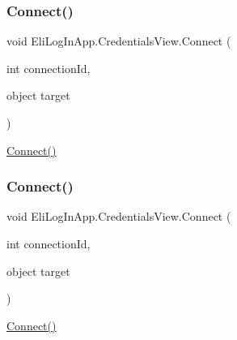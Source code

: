 \mbox{\label{class_eli_log_in_app_1_1_credentials_view_a0a2179d420f12bec24a13d3f35da3b8a}} 
\subsubsection{\texorpdfstring{Connect()}{Connect()}\hspace{0.1cm}{\footnotesize\ttfamily [1/3]}}
{\footnotesize\ttfamily void Eli\+Log\+In\+App.\+Credentials\+View.\+Connect (\begin{DoxyParamCaption}\item[{int}]{connection\+Id,  }\item[{object}]{target }\end{DoxyParamCaption})\hspace{0.3cm}{\ttfamily [inline]}}



\hyperlink{class_eli_log_in_app_1_1_credentials_view_a0a2179d420f12bec24a13d3f35da3b8a}{Connect()} 

\mbox{\label{class_eli_log_in_app_1_1_credentials_view_a0a2179d420f12bec24a13d3f35da3b8a}} 
\subsubsection{\texorpdfstring{Connect()}{Connect()}\hspace{0.1cm}{\footnotesize\ttfamily [2/3]}}
{\footnotesize\ttfamily void Eli\+Log\+In\+App.\+Credentials\+View.\+Connect (\begin{DoxyParamCaption}\item[{int}]{connection\+Id,  }\item[{object}]{target }\end{DoxyParamCaption})\hspace{0.3cm}{\ttfamily [inline]}}



\hyperlink{class_eli_log_in_app_1_1_credentials_view_a0a2179d420f12bec24a13d3f35da3b8a}{Connect()} 

